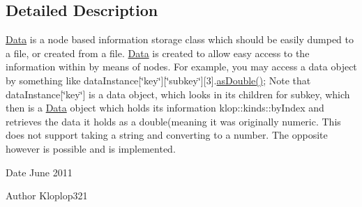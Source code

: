\subsection{Detailed Description}
\hyperlink{classklop_1_1Data}{Data} is a node based information storage class which should be easily dumped to a file, or created from a file. \hyperlink{classklop_1_1Data}{Data} is created to allow easy access to the information within by means of nodes. For example, you may access a data object by something like dataInstance\mbox{[}\char`\"{}key\char`\"{}\mbox{]}\mbox{[}\char`\"{}subkey\char`\"{}\mbox{]}\mbox{[}3\mbox{]}.\hyperlink{classklop_1_1Data_afd3558ce5f444beea44e33c2b50d87d0}{asDouble()}; Note that dataInstance\mbox{[}\char`\"{}key\char`\"{}\mbox{]} is a data object, which looks in its children for subkey, which then is a \hyperlink{classklop_1_1Data}{Data} object which holds its information klop::kinds::byIndex and retrieves the data it holds as a double(meaning it was originally numeric. This does not support taking a string and converting to a number. The opposite however is possible and is implemented. \begin{DoxyDate}{Date}
June 2011 
\end{DoxyDate}
\begin{DoxyAuthor}{Author}
Kloplop321 
\end{DoxyAuthor}



